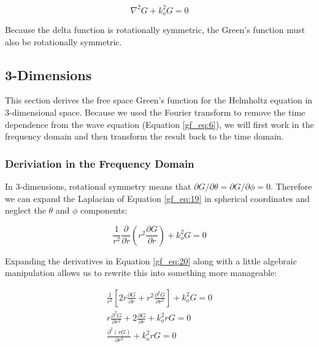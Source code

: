 \begin{equation}
\nabla^2G+ k_o^2G = 0
\label{gf_eq:19}
\end{equation}
\renewcommand{\baselinestretch}{2} \small\normalsize

Because the delta function is rotationally symmetric, the Green's function must also be rotationally symmetric.

\subsection {3-Dimensions}\label{gf_sec:3d}
This section derives the free space Green's function for the Helmholtz equation in 3-dimensional space. Because we used the Fourier transform to remove the time dependence from the wave equation (Equation 
\ref{gf_eq:6}), we will first work in the frequency domain and then transform the result back to the time domain.

\subsubsection {Deriviation in the Frequency Domain}
In 3-dimensions,  rotational symmetry means that  $\partial G/\partial\theta = \partial G/\partial\phi=0$. Therefore we can expand the Laplacian of Equation \ref{gf_eq:19} in spherical coordinates and neglect the $\theta$ and $\phi$ components:

\begin{equation}
\frac{1}{r^2}\frac{\partial}{\partial r}\left(r^2\frac{\partial G}{\partial r}\right)+ k_o^2G = 0
\label{gf_eq:20}
\end{equation}
\renewcommand{\baselinestretch}{2} \small\normalsize

Expanding the derivatives in Equation \ref{gf_eq:20} along with a little algebraic manipulation allows us to rewrite this into something more manageable:

\begin{equation}
\begin{gathered}
\frac{1}{r^2}\left[2r\frac{\partial G}{\partial r}+ r^2\frac{\partial^2 G}{\partial r^2}  \right] + k_o^2G = 0 \\
r\frac{\partial^2 G}{\partial r^2} + 2\frac{\partial G}{\partial r}+ k_o^2rG = 0 \\
\frac{\partial^2 \left(rG\right)}{\partial r^2} + k_o^2rG = 0
\end{gathered}
\label{gf_eq:21}
\end{equation}
\renewcommand{\baselinestretch}{2} \small\normalsize


